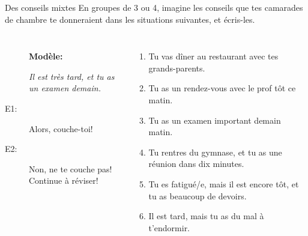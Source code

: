 \begin{frame}{Des conseils mixtes}
  \small
  En groupes de 3 ou 4, imagine les conseils que tes camarades de chambre te donneraient dans les situations suivantes, et écris-les.\\
  \begin{columns}
      \begin{description}
        \item[] \textbf{Modèle:}
        \item[] \emph{Il est très tard, et tu as un examen demain.}
        \item[E1:] Alors, couche-toi!
        \item[] 
        \item[E2:] Non, ne te couche pas! Continue à réviser!
        \item[] 
      \end{description}
      \scriptsize
      \begin{enumerate}
        \item Tu vas dîner au restaurant avec tes grands-parents.
        \item Tu as un rendez-vous avec le prof tôt ce matin.
        \item Tu as un examen important demain matin.
        \item Tu rentres du gymnase, et tu as une réunion dans dix minutes.
        \item Tu es fatigué/e, mais il est encore tôt, et tu as beaucoup de devoirs.
        \item Il est tard, mais tu as du mal à t'endormir.
      \end{enumerate}
  \end{columns}
\end{frame}